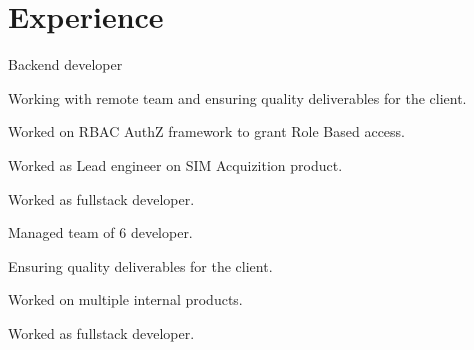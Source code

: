 \documentclass[]{resume}
\begin{document}
\begin{minipage}[t]{0.33\textwidth}

    \end{minipage}
    \hfill
    \begin{minipage}[t]{0.66\textwidth}


        \section{Experience}\label{sec:experience}
        \vspace{\topsep}
        \begin{tightemize}
            \item Backend developer
            \item Working with remote team and ensuring quality deliverables for the client.
            \item Worked on RBAC AuthZ framework to grant Role Based access.
        \end{tightemize}
        \sectionsep

        \begin{tightemize}
            \item Worked as Lead engineer on SIM Acquizition product.
        \end{tightemize}
        \sectionsep

        \begin{tightemize}
            \item Worked as fullstack developer.
            \item Managed team of 6 developer.
            \item Ensuring quality deliverables for the client.
        \end{tightemize}
        \sectionsep

        \begin{tightemize}
            \item Worked on multiple internal products.
            \item Worked as fullstack developer.
        \end{tightemize}
        \sectionsep


\end{minipage}
\end{document}
